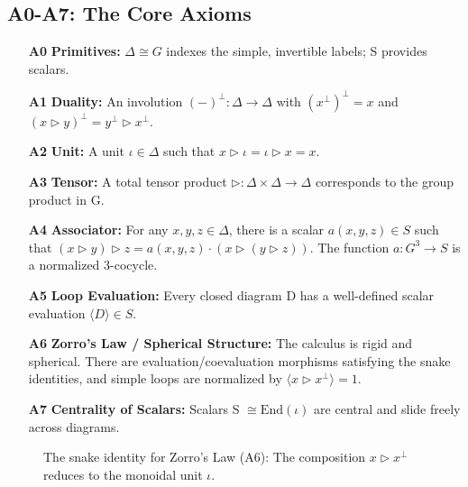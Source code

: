 \documentclass[11pt]{article}
\theoremstyle{definition}
\theoremstyle{remark}
\newcommand{\iotaunit}{\iota}
\newcommand{\tens}{\mathbin{\triangleright}}
\begin{document}
\subsection{A0-A7: The Core Axioms}
\begin{itemize}
    \item[\textbf{A0}] \textbf{Primitives:} $\Delta \cong G$ indexes the simple, invertible labels; S provides scalars.
    \item[\textbf{A1}] \textbf{Duality:} An involution $(-)^\perp: \Delta \to \Delta$ with $(x^\perp)^\perp = x$ and $(x \tens y)^\perp = y^\perp \tens x^\perp$.
    \item[\textbf{A2}] \textbf{Unit:} A unit $\iotaunit \in \Delta$ such that $x \tens \iotaunit = \iotaunit \tens x = x$.
    \item[\textbf{A3}] \textbf{Tensor:} A total tensor product $\tens: \Delta \times \Delta \to \Delta$ corresponds to the group product in G.
    \item[\textbf{A4}] \textbf{Associator:} For any $x,y,z \in \Delta$, there is a scalar $a(x,y,z) \in S$ such that $(x \tens y) \tens z = a(x,y,z) \cdot (x \tens (y \tens z))$. The function $a: G^3 \to S$ is a normalized 3-cocycle.
    \item[\textbf{A5}] \textbf{Loop Evaluation:} Every closed diagram D has a well-defined scalar evaluation $\langle D \rangle \in S$.
    \item[\textbf{A6}] \textbf{Zorro’s Law / Spherical Structure:} The calculus is rigid and spherical. There are evaluation/coevaluation morphisms satisfying the snake identities, and simple loops are normalized by $\langle x \tens x^\perp \rangle = 1$.
    \item[\textbf{A7}] \textbf{Centrality of Scalars:} Scalars S $\cong \mathrm{End}(\iotaunit)$ are central and slide freely across diagrams.
\end{itemize}

\begin{figure}[h]
\centering
{}
\caption{The snake identity for Zorro's Law (A6): The composition $x \tens x^\perp$ reduces to the monoidal unit $\iotaunit$.}
\label{fig:snake-identity}
\end{figure}
\end{document}
